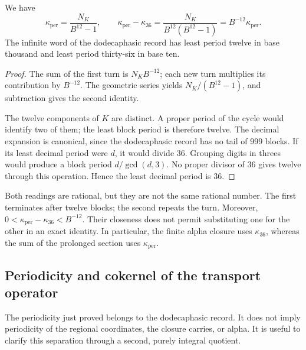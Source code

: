 \begin{proposition}
\label{prop:k-periodo}
We have
\begin{equation}
 \kappa_{\mathrm{per}}=\frac{N_K}{B^{12}-1},\qquad
 \kappa_{\mathrm{per}}-\kappa_{36}
 =\frac{N_K}{B^{12}(B^{12}-1)}
 =B^{-12}\kappa_{\mathrm{per}}.
 \label{eq:k-diferencia-kappas}
\end{equation}
The infinite word of the dodecaphasic record has least period twelve in base thousand and
least period thirty-six in base ten.
\end{proposition}

\begin{proof}
The sum of the first turn is \(N_KB^{-12}\); each new turn
multiplies its contribution by \(B^{-12}\). The geometric series yields
\(N_K/(B^{12}-1)\), and subtraction gives the second identity.

The twelve components of \(K\) are distinct. A proper period of the cycle
would identify two of them; the least block period is therefore
twelve. The decimal expansion is canonical, since the dodecaphasic record has no tail
of 999 blocks. If its least decimal period were \(d\), it would divide
36. Grouping digits in threes would produce a block period
\(d/\gcd(d,3)\). No proper divisor of 36 gives twelve through this
operation. Hence the least decimal period is 36.
\end{proof}

Both readings are rational, but they are not the same rational number. The first
terminates after twelve blocks; the second repeats the turn. Moreover,
\(0<\kappa_{\mathrm{per}}-\kappa_{36}<B^{-12}\). Their closeness does not
permit substituting one for the other in an exact identity. In particular,
the finite alpha closure uses \(\kappa_{36}\), whereas the
sum of the prolonged section uses \(\kappa_{\mathrm{per}}\).



\subsection{Periodicity and cokernel of the transport operator}
\label{subsec:k-clase-acarreo}

The periodicity just proved belongs to the dodecaphasic record. It does not imply
periodicity of the regional coordinates, the closure carries,
or alpha. It is useful to clarify this separation through a second,
purely integral quotient.


